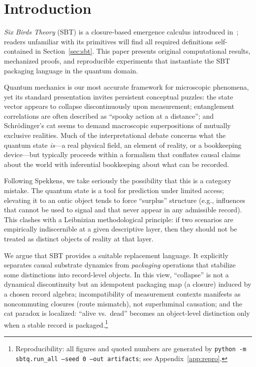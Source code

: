\section{Introduction}

\emph{Six Birds Theory} (SBT) is a closure-based emergence calculus introduced in~\cite{Tsiokos2026SixBirds}; readers unfamiliar with its primitives will find all required definitions self-contained in Section~\ref{sec:sbt}. This paper presents original computational results, mechanized proofs, and reproducible experiments that instantiate the SBT packaging language in the quantum domain.

Quantum mechanics is our most accurate framework for microscopic phenomena, yet its standard presentation invites persistent conceptual puzzles: the state vector appears to collapse discontinuously upon measurement; entanglement correlations are often described as ``spooky action at a distance''; and Schr\"odinger's cat seems to demand macroscopic superpositions of mutually exclusive realities. Much of the interpretational debate concerns what the quantum state \emph{is}---a real physical field, an element of reality, or a bookkeeping device---but typically proceeds within a formalism that conflates causal claims about the world with inferential bookkeeping about what can be recorded.

Following Spekkens, we take seriously the possibility that this is a category mistake.\cite{Spekkens2007Toy} The quantum state is a tool for prediction under limited access; elevating it to an ontic object tends to force ``surplus'' structure (e.g., influences that cannot be used to signal and that never appear in any admissible record). This clashes with a Leibnizian methodological principle: if two scenarios are empirically indiscernible at a given descriptive layer, then they should not be treated as distinct objects of reality at that layer.

We argue that SBT provides a suitable replacement language.\cite{Tsiokos2026SixBirds} It explicitly separates causal substrate dynamics from \emph{packaging} operations that stabilize some distinctions into record-level objects. In this view, ``collapse'' is not a dynamical discontinuity but an idempotent packaging map (a closure) induced by a chosen record algebra; incompatibility of measurement contexts manifests as noncommuting closures (route mismatch), not superluminal causation; and the cat paradox is localized: ``alive vs.\ dead'' becomes an object-level distinction only when a stable record is packaged.\footnote{Reproducibility: all figures and quoted numbers are generated by \texttt{python -m sbtq.run\_all --seed 0 --out artifacts}; see Appendix~\ref{app:repro}.}

